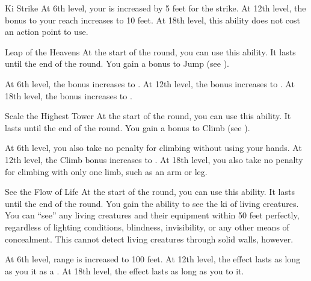 {\begin{ability}{Ki Strike}
                At 6th level, your  is increased by 5 feet for the strike.
                At 12th level, the bonus to your reach increases to 10 feet. 
                At 18th level, this ability does not cost an action point to use.
            \end{ability}

            \begin{ability}{Leap of the Heavens}
                At the start of the round, you can use this ability.
                It lasts until the end of the round.
                You gain a  bonus to Jump (see ).

                At 6th level, the bonus increases to .
                At 12th level, the bonus increases to .
                At 18th level, the bonus increases to .
            \end{ability}

            \begin{ability}{Scale the Highest Tower}
                At the start of the round, you can use this ability.
                It lasts until the end of the round.
                You gain a  bonus to Climb (see ).

                At 6th level, you also take no penalty for climbing without using your hands.
                At 12th level, the Climb bonus increases to .
                At 18th level, you also take no penalty for climbing with only one limb, such as an arm or leg.
            \end{ability}

            \begin{ability}{See the Flow of Life}
                At the start of the round, you can use this ability.
                It lasts until the end of the round.
                You gain the ability to see the ki of living creatures.
                You can ``see'' any living creatures and their equipment within 50 feet perfectly, regardless of lighting conditions, blindness, invisibility, or any other means of concealment.
                This cannot detect living creatures through solid walls, however.

                At 6th level, range is increased to 100 feet.
                At 12th level, the effect lasts as long as you  it as a .
                At 18th level, the effect lasts as long as you  to it.
            \end{ability}

}
